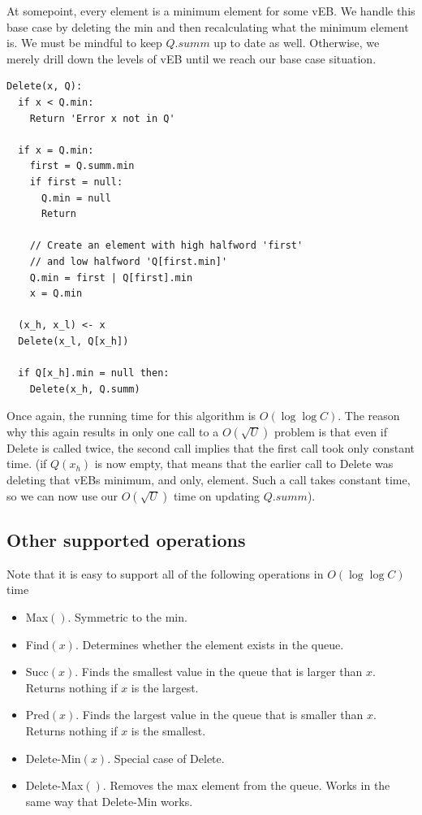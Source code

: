 \documentclass{article}[10pt]
\begin{document}
At somepoint, every element is a minimum element for some vEB.  We handle
this base case by deleting the min and then recalculating what the minimum
element is.  We must be mindful to keep $Q.summ$ up to date as well.
Otherwise, we merely drill down the levels of vEB until we reach our base case
situation.

\begin{lstlisting}[mathescape]
Delete(x, Q):
  if x < Q.min:
    Return 'Error x not in Q'

  if x = Q.min:
    first = Q.summ.min
    if first = null:
      Q.min = null
      Return

    // Create an element with high halfword 'first'
    // and low halfword 'Q[first.min]'
    Q.min = first | Q[first].min
    x = Q.min

  (x_h, x_l) <- x 
  Delete(x_l, Q[x_h])

  if Q[x_h].min = null then:
    Delete(x_h, Q.summ)
\end{lstlisting}

Once again, the running time for this algorithm is $O(\log \log C)$.
The reason why this again results in only one call to a $O(\sqrt{U})$ problem
is that even if {\sc Delete} is called twice, the second call implies that
the first call took only constant time. (if $Q(x_h)$ is now empty, that means
that the earlier call to {\sc Delete} was deleting that vEBs minimum, and only,
element. Such a call takes constant time, so we can now use our $O(\sqrt{U})$
time on updating $Q.summ$).



\subsection{Other supported operations}

Note that it is easy to support all of the following
operations in $O(\log \log C)$ time
\begin{itemize}
\item {\sc Max}$()$. Symmetric to the min.
\item {\sc Find}$(x)$. Determines whether the element exists in the queue.
\item {\sc Succ}$(x)$. Finds the smallest value in the queue that is 
                larger than $x$.  Returns nothing if $x$ is the largest.
\item {\sc Pred}$(x)$. Finds the largest value in the queue that is 
                smaller than $x$.  Returns nothing if $x$ is the smallest.
\item {\sc Delete-Min}$(x)$. Special case of {\sc Delete}.
\item {\sc Delete-Max}$()$. Removes the max element from the queue.  Works in the same way that {\sc Delete-Min} works.
\end{itemize}
\end{document}
